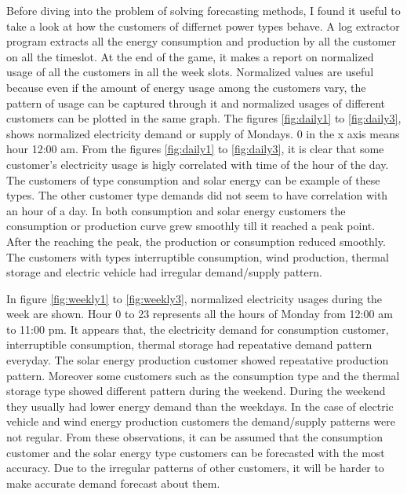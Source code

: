 Before diving into the problem of solving forecasting methods, I found it useful to take a look at how the customers of differnet power types behave. A log extractor program extracts all the energy consumption and production by all the customer on all the timeslot. At the end of the game, it makes a report on normalized usage of all the customers in all the week slots. Normalized values are useful because even if the amount of energy usage among the customers vary, the pattern of usage can be captured through it and normalized usages of different customers can be plotted in the same graph. The figures \ref{fig:daily1} to \ref{fig:daily3}, shows normalized electricity demand or supply of Mondays. 0 in the x axis means hour 12:00 am. From the figures \ref{fig:daily1} to \ref{fig:daily3}, it is clear that some customer's electricity usage is higly correlated with time of the hour of the day. The customers of type consumption and solar energy can be example of these types. The other customer type demands did not seem to have correlation with an hour of a day. In both consumption and solar energy customers the consumption or production curve grew smoothly till it reached a peak point. After the reaching the peak, the production or consumption reduced smoothly. The customers with types interruptible consumption, wind production, thermal storage and electric vehicle had irregular demand/supply pattern. 

In figure \ref{fig:weekly1} to \ref{fig:weekly3}, normalized electricity usages during the week are shown. Hour 0 to 23 represents all the hours of Monday from 12:00 am to 11:00 pm. It appears that, the electricity demand for consumption customer, interruptible consumption, thermal storage had repeatative demand pattern everyday. The  solar energy production customer showed repeatative production pattern. Moreover some customers such as the consumption type and the thermal storage type showed different pattern during the weekend. During the weekend they usually had lower energy demand than the weekdays. In the case of electric vehicle and wind energy production customers the demand/supply patterns were not regular. From these observations, it can be assumed that the consumption customer and the solar energy type customers can be forecasted with the most accuracy. Due to the irregular patterns of other customers, it will be harder to make accurate demand forecast about them.
 
